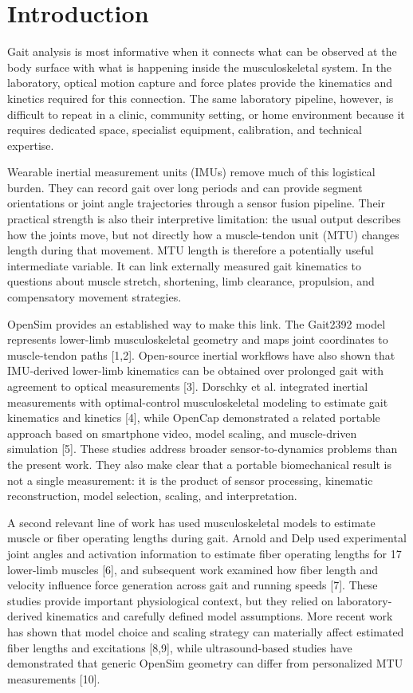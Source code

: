 \documentclass[11pt]{article}
\begin{document}
\section{Introduction}

Gait analysis is most informative when it connects what can be observed at the body surface with what is happening inside the musculoskeletal system. In the laboratory, optical motion capture and force plates provide the kinematics and kinetics required for this connection. The same laboratory pipeline, however, is difficult to repeat in a clinic, community setting, or home environment because it requires dedicated space, specialist equipment, calibration, and technical expertise.

Wearable inertial measurement units (IMUs) remove much of this logistical burden. They can record gait over long periods and can provide segment orientations or joint angle trajectories through a sensor fusion pipeline. Their practical strength is also their interpretive limitation: the usual output describes how the joints move, but not directly how a muscle-tendon unit (MTU) changes length during that movement. MTU length is therefore a potentially useful intermediate variable. It can link externally measured gait kinematics to questions about muscle stretch, shortening, limb clearance, propulsion, and compensatory movement strategies.

OpenSim provides an established way to make this link. The Gait2392 model represents lower-limb musculoskeletal geometry and maps joint coordinates to muscle-tendon paths [1,2]. Open-source inertial workflows have also shown that IMU-derived lower-limb kinematics can be obtained over prolonged gait with agreement to optical measurements [3]. Dorschky et al. integrated inertial measurements with optimal-control musculoskeletal modeling to estimate gait kinematics and kinetics [4], while OpenCap demonstrated a related portable approach based on smartphone video, model scaling, and muscle-driven simulation [5]. These studies address broader sensor-to-dynamics problems than the present work. They also make clear that a portable biomechanical result is not a single measurement: it is the product of sensor processing, kinematic reconstruction, model selection, scaling, and interpretation.

A second relevant line of work has used musculoskeletal models to estimate muscle or fiber operating lengths during gait. Arnold and Delp used experimental joint angles and activation information to estimate fiber operating lengths for 17 lower-limb muscles [6], and subsequent work examined how fiber length and velocity influence force generation across gait and running speeds [7]. These studies provide important physiological context, but they relied on laboratory-derived kinematics and carefully defined model assumptions. More recent work has shown that model choice and scaling strategy can materially affect estimated fiber lengths and excitations [8,9], while ultrasound-based studies have demonstrated that generic OpenSim geometry can differ from personalized MTU measurements [10].
\end{document}
